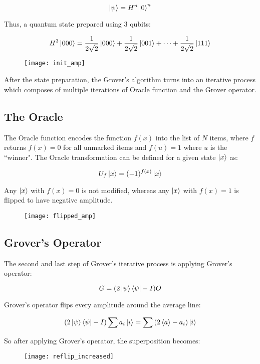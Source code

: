 \documentclass[a4paper]{article}
\begin{document}
$$ \ket{\psi} = H^{n}\ket{0}^{n} $$

Thus, a quantum state prepared using 3 qubits:

\[
    H^{3}\ket{000} = \frac{1}{2\sqrt{2}}\ket{000} +
    \frac{1}{2\sqrt{2}}\ket{001} + \cdots + \frac{1}{2\sqrt{2}}\ket{111} 
\]

\begin{figure}[h]
\texttt{[image: init\_amp]}
\centering
\end{figure}

After the state preparation, the Grover’s algorithm turns into an iterative
process which composes of multiple iterations of Oracle function and the Grover
operator.
\pagebreak

\subsection{ The Oracle }
The Oracle function encodes the function $f(x)$ into the list of $N$ items, where
$f$ returns $f(x) = 0$ for all unmarked items and $f(u) = 1$ where $u$ is the 
``winner". The Oracle transformation can be defined for a given state $\ket{x}$ as:

$$ U_f\ket{x} = (-1)^{f(x)}\ket{x} $$
\par

Any $\ket{x}$ with $f(x) = 0$ is not modified, whereas any $\ket{x}$ with $f(x) = 1$
is flipped to have negative amplitude.

\begin{figure}[h]
\texttt{[image: flipped\_amp]}
\centering
\end{figure}

\subsection{ Grover's Operator }
The second and last step of Grover's iterative process is applying Grover's operator:

$$ G = (2\ket{\psi}\bra{\psi} - I)O $$

Grover's operator flips every amplitude around the average line:

$$ (2\ket{\psi}\bra{\psi} - I)\sum{a_i \ket{i}} = \sum{(2\braket{a} - a_i)\ket{i}} $$

So after applying Grover's operator, the superposition becomes:

\begin{figure}[h]
\texttt{[image: reflip\_increased]}
\centering
\end{figure}
\end{document}
